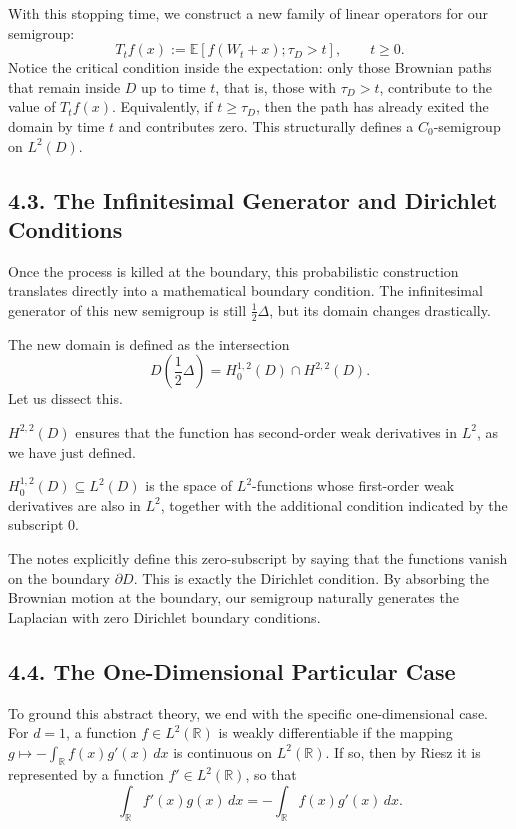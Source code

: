 \documentclass[11pt]{article}
\theoremstyle{definition}
\theoremstyle{remark}
\begin{document}
With this stopping time, we construct a new family of linear operators for our semigroup:
\[
T_t f(x):=\mathbb E[f(W_t+x);\tau_D>t],
\qquad t\ge 0.
\]
Notice the critical condition inside the expectation: only those Brownian paths that remain inside \(D\) up to time \(t\), that is, those with \(\tau_D>t\), contribute to the value of \(T_t f(x)\). Equivalently, if \(t\ge \tau_D\), then the path has already exited the domain by time \(t\) and contributes zero. This structurally defines a \(C_0\)-semigroup on \(L^2(D)\).

\subsection*{4.3. The Infinitesimal Generator and Dirichlet Conditions}
Once the process is killed at the boundary, this probabilistic construction translates directly into a mathematical boundary condition. The infinitesimal generator of this new semigroup is still \(\frac12\Delta\), but its domain changes drastically.

The new domain is defined as the intersection
\[
D\!\left(\frac12\Delta\right)=H_0^{1,2}(D)\cap H^{2,2}(D).
\]
Let us dissect this.

\(H^{2,2}(D)\) ensures that the function has second-order weak derivatives in \(L^2\), as we have just defined.

\(H_0^{1,2}(D)\subseteq L^2(D)\) is the space of \(L^2\)-functions whose first-order weak derivatives are also in \(L^2\), together with the additional condition indicated by the subscript \(0\).

The notes explicitly define this zero-subscript by saying that the functions vanish on the boundary \(\partial D\). This is exactly the Dirichlet condition. By absorbing the Brownian motion at the boundary, our semigroup naturally generates the Laplacian with zero Dirichlet boundary conditions.

\subsection*{4.4. The One-Dimensional Particular Case}
To ground this abstract theory, we end with the specific one-dimensional case. For \(d=1\), a function \(f\in L^2(\mathbb R)\) is weakly differentiable if the mapping \(g\mapsto -\int_{\mathbb R} f(x)g'(x)\,dx\) is continuous on \(L^2(\mathbb R)\). If so, then by Riesz it is represented by a function \(f'\in L^2(\mathbb R)\), so that
\[
\int_{\mathbb R} f'(x)g(x)\,dx
=
-\int_{\mathbb R} f(x)g'(x)\,dx.
\]
\end{document}

